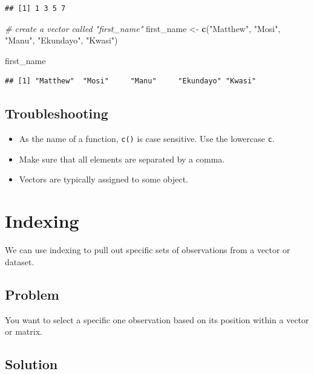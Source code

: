 \documentclass[
]{book}
\newenvironment{Shaded}{\begin{snugshade}}{\end{snugshade}}
\newcommand{\CommentTok}[1]{\textcolor[rgb]{0.56,0.35,0.01}{\textit{#1}}}
\newcommand{\FunctionTok}[1]{\textcolor[rgb]{0.13,0.29,0.53}{\textbf{#1}}}
\newcommand{\NormalTok}[1]{#1}
\newcommand{\OtherTok}[1]{\textcolor[rgb]{0.56,0.35,0.01}{#1}}
\newcommand{\StringTok}[1]{\textcolor[rgb]{0.31,0.60,0.02}{#1}}
\providecommand{\tightlist}{%
  \setlength{\itemsep}{0pt}\setlength{\parskip}{0pt}}
\begin{document}
\begin{verbatim}
## [1] 1 3 5 7
\end{verbatim}

\begin{Shaded}
\begin{Highlighting}[]
\CommentTok{\# create a vector called "first\_name"}
\NormalTok{first\_name }\OtherTok{\textless{}{-}} \FunctionTok{c}\NormalTok{(}\StringTok{"Matthew"}\NormalTok{, }\StringTok{"Mosi"}\NormalTok{, }\StringTok{"Manu"}\NormalTok{, }\StringTok{"Ekundayo"}\NormalTok{, }\StringTok{"Kwasi"}\NormalTok{)}

\NormalTok{first\_name}
\end{Highlighting}
\end{Shaded}

\begin{verbatim}
## [1] "Matthew"  "Mosi"     "Manu"     "Ekundayo" "Kwasi"
\end{verbatim}

\hypertarget{troubleshooting-2}{%
\subsection{Troubleshooting}\label{troubleshooting-2}}

\begin{itemize}
\tightlist
\item
  As the name of a function, \texttt{c()} is case sensitive. Use the lowercase \texttt{c}.
\item
  Make sure that all elements are separated by a comma.
\item
  Vectors are typically assigned to some object.
\end{itemize}

\hypertarget{indexing}{%
\section{Indexing}\label{indexing}}

We can use indexing to pull out specific sets of observations from a vector or dataset.

\hypertarget{problem-3}{%
\subsection{Problem}\label{problem-3}}

You want to select a specific one observation based on its position within a vector or matrix.

\hypertarget{solution-3}{%
\subsection{Solution}\label{solution-3}}
\end{document}
